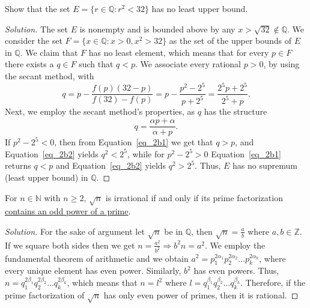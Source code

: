 \documentclass[12pt]{article}
\newenvironment{exercise}[2][Exercise]{\begin{trivlist}
\item[\hskip \labelsep {\bfseries #1}\hskip \labelsep {\bfseries #2.}]}{\end{trivlist}}
\newenvironment{solution}{\begin{proof}[Solution]}{\end{proof}}
\begin{document}
\begin{exercise}{2 (b)} %
Show that the set $E=\{ r\in \mathbb{Q}: r^2<32 \}$ has no least upper bound.
\end{exercise}
\begin{solution}
The set $E$ is nonempty and is bounded above by any $x> \sqrt{32}\notin \mathbb{Q} $. We consider the set $F=\{ x\in \mathbb{Q}:x>0, x^2>32 \}$ as the set of the upper bounds of $E$ in $\mathbb{Q}$. We claim that $F$ has no least element, which means that for every $p\in F$ there exists a $q\in F$ such that $q<p$. We associate every rational $p>0$, by using the secant method, with 
\begin{equation}\label{eq_2b1}
q=p-\frac{f(p)(32-p)}{f(32)-f(p)}=p-\frac{p^2-2^5}{p+2^5}=\frac{2^5p+2^5}{2^5+p}.
\end{equation}
Next, we employ the secant method's properties, as $q $ has the structure
\begin{equation}\label{eq_2b2}
q=\frac{\alpha p+\alpha}{\alpha + p}.
\end{equation}
If $p^2-2^5<0$, then from Equation~\ref{eq_2b1} we get that $q>p$, and Equation~\ref{eq_2b2} yields $q^2<2^5$, while for $p^2-2^5>0$ Equation~\ref{eq_2b1} returns $q<p $ and Equation~\ref{eq_2b2} yields $q^2>2^5$. Thus, $E $ has no supremum (least upper bound) in $\mathbb{Q}$.
\end{solution}

\begin{exercise}{3} %
For $n\in \mathbb{N}$ with $n\geq 2$, $\sqrt{n}$ is irrational if and only if its prime factorization \underline{contains an odd power of a prime}.
\end{exercise}
\begin{solution}
For the sake of argument let $\sqrt{n}$ be in $\mathbb{Q}$, then $\sqrt{n}=\frac{a}{b}$ where $a,b \in \mathbb{Z}$. If we square both sides then we get $n=\frac{a^2}{b^2} \Rightarrow b^2n=a^2$. We employ the fundamental theorem of arithmetic and we obtain $a^2=p_1^{2 \alpha_1}p_2^{2 \alpha_2} \hdots p_k^{2 \alpha_k}$, where every unique element has even power. Similarly, $b^2$ has even powers. Thus, $n=q_1^{2 \beta_1}q_2^{2 \beta_2} \hdots q_k^{2 \beta_k}$, which means that $n=l^2$ where $l=q_1^{\beta_1}q_2^{\beta_2} \hdots q_k^{\beta_k}$. Therefore, if the prime factorization of $\sqrt{n}$ has only even power of primes, then it is rational.
\end{solution}
\end{document}
